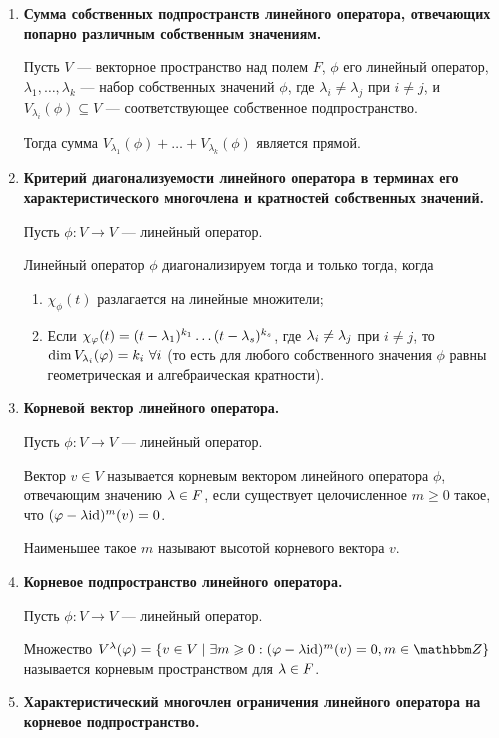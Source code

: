 \begin{enumerate}
\item \textbf{Сумма собственных подпространств линейного оператора, отвечающих попарно различным собственным значениям.}

Пусть $V$ --- векторное пространство над полем $F$, $\phi$ его линейный оператор, $\lambda_1, \ldots, \lambda_k$ --- набор собственных значений $\phi$, где $\lambda_i \neq \lambda_j$ при $i \neq j$, и $V_{\lambda_i}(\phi) \subseteq V$ --- соответствующее собственное подпространство.

Тогда сумма $V_{\lambda_1}(\phi) + \ldots + V_{\lambda_k}(\phi)$ является прямой.

\item \textbf{Критерий диагонализуемости линейного оператора в терминах его характеристического многочлена и кратностей собственных значений.}

Пусть $\phi\colon V \rightarrow V$ --- линейный оператор.

Линейный оператор $\phi$ диагонализируем тогда и только тогда, когда 
\begin{enumerate}
\item $\chi_\phi(t)$ разлагается на линейные множители;
\item Если $\chi_\varphi(t) = (t - \lambda_1)^{k_1}\dots(t - \lambda_s)^{k_s}$, где $\lambda_i \neq \lambda_j$ при $i \neq j$, то $\dim V_{\lambda_i}(\varphi) = k_i \ \forall i$ (то есть для любого собственного значения $\phi$ равны геометрическая и алгебраическая кратности).
\end{enumerate}

\item \textbf{Корневой вектор линейного оператора.}

Пусть $\phi\colon V \rightarrow V$ --- линейный оператор.

Вектор $v \in V$ называется корневым вектором линейного оператора $\phi$, отвечающим значению $\lambda \in F$, если существует целочисленное $m \geqslant 0$ такое, что $(\varphi - \lambda\mathrm{id})^m(v) = 0$.

Наименьшее такое $m$ называют высотой корневого вектора $v$.

\item \textbf{Корневое подпространство линейного оператора.}

Пусть $\phi\colon V \rightarrow V$ --- линейный оператор.

Множество $V^\l(\phi) = \{ v \in V \mid \exists m \geqslant 0  : (\phi - \l\id)^m(v) = 0, m \in \mathbb Z \}$ называется корневым пространством для $\lambda \in F$.

\item \textbf{Характеристический многочлен ограничения линейного оператора на корневое подпространство.}


\end{enumerate}
